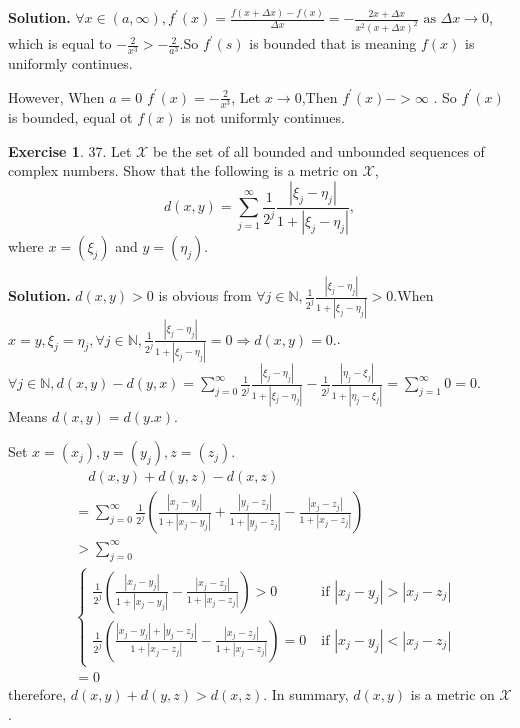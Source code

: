 \documentclass[a4paper]{book}
\newenvironment{solution}%
{\noindent\textbf{Solution.}}%
{\qedhere}
\numberwithin{equation}{chapter}
\theoremstyle{definition}
\newtheorem{exc}[exm]{Exercise}
\begin{document}
\begin{multicols}{2}
\begin{solution}
	$\forall x \in (a, \infty), f^\prime(x) = \frac{f(x + \Delta x) - f(x)}{\Delta x} = -\frac{2x + \Delta x}{x^2(x + \Delta x)^2} \text{ as } \Delta x \rightarrow 0 $, which is equal to $  - \frac{2}{x^3} > - \frac{2}{a^3} $.So $ f^\prime(s) $ is bounded that is meaning $f(x)$ is uniformly continues.
	
	However, When $ a = 0$ $f^\prime(x) = -\frac{2}{x^3} $, Let $x \rightarrow 0$,Then $f^\prime(x) -> \infty$ . So $f^\prime(x) $ is bounded, equal ot $f(x)$ is not uniformly continues.  
\end{solution}

\begin{exc}
	37. Let $\mathcal{X}$ be the set of all bounded and unbounded sequences of complex numbers. Show that the following is a metric on $ \mathcal{X} $,
	\begin{equation}
		d(x,y) = \sum_{j = 1}^{\infty} \frac{1}{2^j} \frac{|\xi_j - \eta_j|}{1 + |\xi_j - \eta_j|},
	\end{equation}
	where $x = (\xi_j)$ and $ y = (\eta_j) $.
\end{exc}

\begin{solution}
	$d(x,y) > 0$ is obvious from $ \forall j \in \mathbb{N}, \frac{1}{2^j} \frac{|\xi_j - \eta_j|}{1 + |\xi_j - \eta_j|} > 0 $.When $x = y, \xi_j = \eta_j, \forall j \in \mathbb{N}, \frac{1}{2^j} \frac{|\xi_j - \eta_j|}{1 + |\xi_j - \eta_j|} = 0 \Longrightarrow d(x,y) = 0.$. $\forall j \in \mathbb{N}, d(x,y) - d(y,x) = \sum_{j = 0}^{\infty} \frac{1}{2^j} \frac{|\xi_j - \eta_j|}{1 + |\xi_j - \eta_j|} - \frac{1}{2^j} \frac{|\eta_j - \xi_j|}{1 + |\eta_j - \xi_j|} = \sum_{j = 1}^{\infty} 0 = 0.$Means $ d(x,y) = d(y.x). $
	
	Set $x = (x_j), y = (y_j), z = (z_j)$. 
	\begin{equation}
	\begin{aligned}
	&\quad d(x,y) + d(y,z) - d(x,z) \\
	&= \sum_{j = 0}^{\infty} \frac{1}{2^j} (\frac{|x_j - y_j|}{1 + |x_j - y_j|} + \frac{|y_j - z_j|}{1 + |y_j - z_j|} - \frac{|x_j - z_j|}{1 + |x_j - z_j|})\\
	&> \sum_{j = 0}^{\infty} \\
	&\begin{cases}
	 \frac{1}{2^j} (\frac{|x_j - y_j|}{1 + |x_j - y_j|} - \frac{|x_j - z_j|}{1 + |x_j - z_j|}) > 0 \qquad  &\text{if } |x_j - y_j| > |x_j - z_j| \\
	 \frac{1}{2^j} (\frac{|x_j - y_j| + |y_j - z_j|}{1 + |x_j - z_j|} - \frac{|x_j - z_j|}{1 + |x_j - z_j|}) = 0  \; &\text{if } |x_j - y_j| < |x_j - z_j|
	\end{cases}
	\\ &= 0
	\end{aligned}
	\end{equation}
	therefore, $ d(x,y) + d(y,z) > d(x,z) $.
	In summary, $ d(x,y) $ is a metric on $ \mathcal{X} $.
\end{solution}


\end{multicols}
\end{document}

